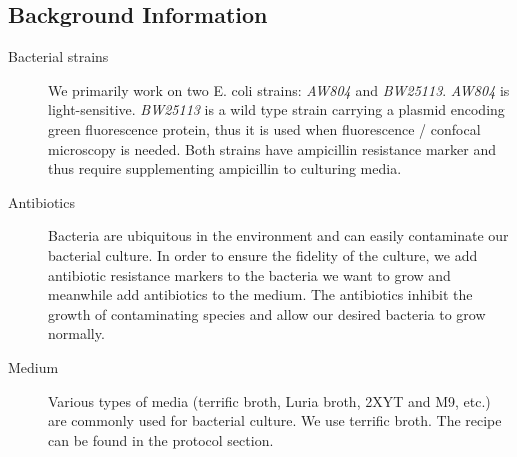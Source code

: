 \subsection{Background Information}
\begin{description}
  \item [Bacterial strains] We primarily work on two E. coli strains: \textit{AW804} and \textit{BW25113}. \textit{AW804} is light-sensitive. \textit{BW25113} is a wild type strain carrying a plasmid encoding green fluorescence protein, thus it is used when fluorescence / confocal microscopy is needed. Both strains have ampicillin resistance marker and thus require supplementing ampicillin to culturing media.
  \item [Antibiotics] Bacteria are ubiquitous in the environment and can easily  contaminate our bacterial culture. In order to ensure the fidelity of the culture, we add antibiotic resistance markers to the bacteria we want to grow and meanwhile add antibiotics to the medium. The antibiotics inhibit the growth of contaminating species and allow our desired bacteria to grow normally.
  \item [Medium] Various types of media (terrific broth, Luria broth, 2XYT and M9, etc.) are commonly used for bacterial culture. We use terrific broth. The recipe can be found in the protocol section.
\end{description}

